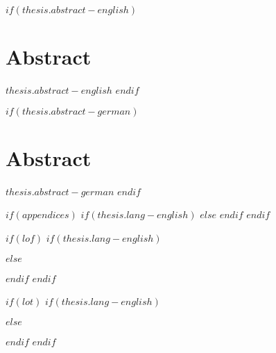 
$if(thesis.abstract-english)$
\section*{\sffamily Abstract}
\normalsize{$thesis.abstract-english$}
\vspace*{\baselineskip}
\clearpage
$endif$


$if(thesis.abstract-german)$
\section*{\sffamily Abstract}
\normalsize{$thesis.abstract-german$}
\clearpage
$endif$



$if(appendices)$
$if(thesis.lang-english)$
$else$
\renewcommand{\appendixname}{Anhang}
\renewcommand{\appendixpagename}{Anhang}
\renewcommand{\appendixtocname}{Anhang}
$endif$
$endif$


$if(lof)$
$if(thesis.lang-english)$
    \listoffigures
$else$
    \renewcommand*\listfigurename{Abbildungsverzeichnis}
    \listoffigures
$endif$
$endif$




$if(lot)$
$if(thesis.lang-english)$
    \listoftables
$else$
    \renewcommand*\listtablename{Tabellenverzeichnis}
    \listoftables
$endif$
$endif$

